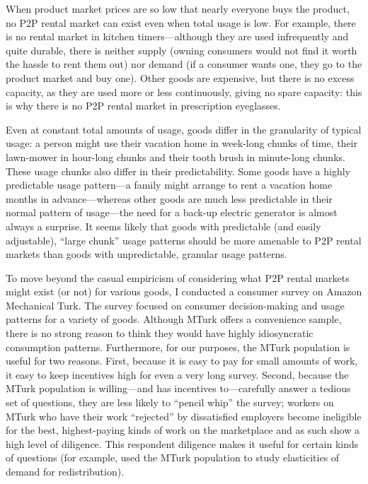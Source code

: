 \documentclass[11pt]{article}
\begin{document}
When product market prices are so low that nearly everyone buys the product, no P2P rental market can exist even when total usage is low.  
For example, there is no rental market in kitchen timers---although they are used infrequently and quite durable, there is neither supply (owning consumers would not find it worth the hassle to rent them out) nor demand (if a consumer wants one, they go to the product market and buy one). 
Other goods are expensive, but there is no excess capacity, as they are used more or less continuously, giving no spare capacity: this is why there is no P2P rental market in prescription eyeglasses. 

Even at constant total amounts of usage, goods differ in the granularity of typical usage: 
a person might use their vacation home in week-long chunks of time, their lawn-mower in hour-long chunks and their tooth brush in minute-long chunks. 
These usage chunks also differ in their predictability. 
Some goods have a highly predictable usage pattern---a family might arrange to rent a vacation home months in advance---whereas other goods are much less predictable in their normal pattern of usage---the need for a back-up electric generator is almost always a surprise.  
It seems likely that goods with predictable (and easily adjustable), ``large chunk'' usage patterns should be more amenable to P2P rental markets than goods with unpredictable, granular usage patterns. 

To move beyond the casual empiricism of considering what P2P rental markets might exist (or not) for various goods, I conducted a consumer survey on Amazon Mechanical Turk. 
The survey focused on consumer decision-making and usage patterns for a variety of goods. 
Although MTurk offers a convenience sample, there is no strong reason to think they would have highly idiosyncratic consumption patterns. 
Furthermore, for our purposes, the MTurk population is useful for two reasons. 
First, because it is easy to pay for small amounts of work, it easy to keep incentives high for even a very long survey. 
Second, because the MTurk population is willing---and has incentives to---carefully answer a tedious set of questions, they are less likely to ``pencil whip'' the survey; 
workers on MTurk who have their work ``rejected'' by dissatisfied employers become ineligible for the best, highest-paying kinds of work on the marketplace and as such show a high level of diligence.    
This respondent diligence makes it useful for certain kinds of questions (for example, \cite{kuziemko2013elastic} used the MTurk population to study elasticities of demand for redistribution).  
\end{document}
